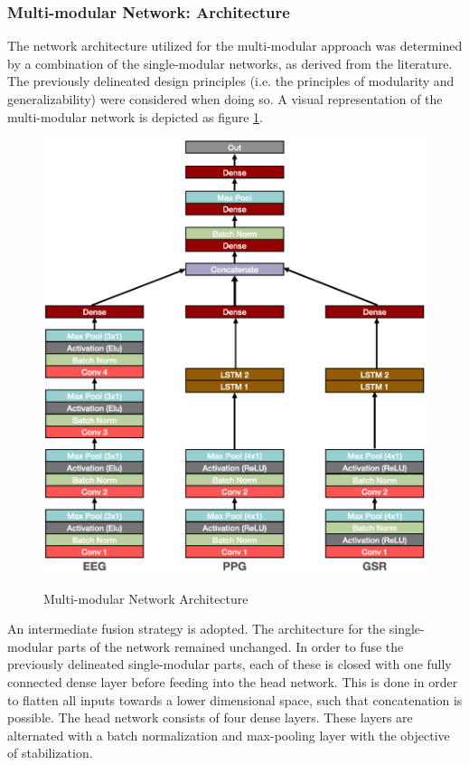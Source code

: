 \documentclass[12pt]{article}
\begin{document}
\newpage
\subsubsection{Multi-modular Network: Architecture}
The network architecture utilized for the multi-modular approach was determined by a combination of the single-modular networks, as derived from the literature. The previously delineated design principles (i.e. the principles of modularity and generalizability) were considered when doing so. A visual representation of the multi-modular network is depicted as figure \ref{fig:multiarchitecture}.

\begin{figure}
\caption{Multi-modular Network Architecture}
\bigskip
\includegraphics[scale=0.725]{multi_model_architecture}
\label{fig:multiarchitecture}
\end{figure}

An intermediate fusion strategy is adopted. The architecture for the single-modular parts of the network remained unchanged. In order to fuse the previously delineated single-modular parts, each of these is closed with one fully connected dense layer before feeding into the head network. This is done in order to flatten all inputs towards a lower dimensional space, such that concatenation is possible. The head network consists of four dense layers. These layers are alternated with a batch normalization and max-pooling layer with the objective of stabilization. 
\end{document}
